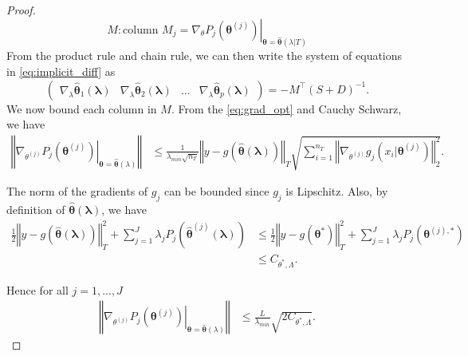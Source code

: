 \documentclass[10pt]{book}
\theoremstyle{definition}
\begin{document}
\begin{proof}
	
	\[
	M: \text{column } M_j = \left. \nabla_{\theta}P_{j}(\boldsymbol{\theta}^{(j)})
	\right|_{\boldsymbol{\theta}=\hat{\boldsymbol{\theta}}(\lambda|T)}
	\]
	From the product rule and chain rule, we can then write the system of equations in \eqref{eq:implicit_diff} as
	\begin{equation}
	\label{eq:param_matrix}
	\left(\begin{array}{cccc}
	\nabla_{\lambda}\hat{\boldsymbol{\theta}}_{1}(\boldsymbol{\lambda}) & \nabla_{\lambda}\hat{\boldsymbol{\theta}}_{2}(\boldsymbol{\lambda}) & ... & \nabla_{\lambda}\hat{\boldsymbol{\theta}}_{p}(\boldsymbol{\lambda})\end{array}\right)=-M^{\top}\left(S+D\right)^{-1}.
	\end{equation}
	We now bound each column in $M$. From the \eqref{eq:grad_opt} and Cauchy Schwarz, we have 
	\begin{align*}
		\left\Vert \left.\nabla_{\theta^{(j)}}P_{j}(\boldsymbol{\theta}^{(j)})\right|_{\boldsymbol{\theta}=\hat{\boldsymbol{\theta}}(\lambda)}\right\Vert  & \le  \frac{1}{\lambda_{min}\sqrt{n_{T}}}\left\Vert y-g(\hat{\boldsymbol{\theta}}(\boldsymbol{\lambda}))\right\Vert _{T}\sqrt{\sum_{i=1}^{n_{T}}\left\Vert \nabla_{\theta^{(j)}}g_{j}(x_{i}|\boldsymbol{\theta}^{(j)})\right\Vert _{2}^{2}}.
	\end{align*}
	
	The norm of the gradients of $g_j$ can be bounded since $g_j$ is Lipschitz. Also, by definition of $\hat{\boldsymbol{\theta}}(\boldsymbol{\lambda})$, we have
	\begin{align*}
	\frac{1}{2}\left\Vert y-g(\hat{\boldsymbol{\theta}}(\boldsymbol{\lambda}))\right\Vert _{T}^{2}+\sum_{j=1}^{J}\lambda_{j}P_{j}\left(\hat{\boldsymbol{\theta}}^{(j)}(\boldsymbol{\lambda})\right) & \le \frac{1}{2}\left\Vert y-g(\boldsymbol{\theta}^{*})\right\Vert _{T}^{2}+\sum_{j=1}^{J}\lambda_{j}P_{j}(\boldsymbol{\theta}^{(j),*})\\
	& \le C_{\theta^{*},\Lambda}.
	\end{align*}
	
	Hence for all $j=1,...,J$
	\begin{align}
	\left\Vert \left.\nabla_{\theta^{(j)}}P_{j}(\boldsymbol{\theta}^{(j)})\right|_{\boldsymbol{\theta}=\hat{\boldsymbol{\theta}}(\lambda)}\right\Vert  & \le \frac{L}{\lambda_{min}}\sqrt{2C_{\theta^{*},\Lambda}}.
	\end{align}
	

\end{proof}
\end{document}
